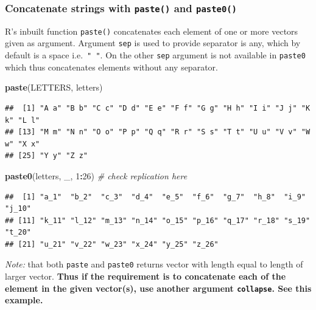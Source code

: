 \documentclass[
]{book}
\newenvironment{Shaded}{\begin{snugshade}}{\end{snugshade}}
\newcommand{\CommentTok}[1]{\textcolor[rgb]{0.56,0.35,0.01}{\textit{#1}}}
\newcommand{\DecValTok}[1]{\textcolor[rgb]{0.00,0.00,0.81}{#1}}
\newcommand{\FunctionTok}[1]{\textcolor[rgb]{0.13,0.29,0.53}{\textbf{#1}}}
\newcommand{\NormalTok}[1]{#1}
\newcommand{\SpecialCharTok}[1]{\textcolor[rgb]{0.81,0.36,0.00}{\textbf{#1}}}
\newcommand{\StringTok}[1]{\textcolor[rgb]{0.31,0.60,0.02}{#1}}
\begin{document}
\hypertarget{concatenate-strings-with-paste-and-paste0}{%
\subsubsection*{\texorpdfstring{Concatenate strings with \texttt{paste()} and \texttt{paste0()}}{Concatenate strings with paste() and paste0()}}\label{concatenate-strings-with-paste-and-paste0}}

R's inbuilt function \texttt{paste()} concatenates each element of one or more vectors given as argument. Argument \texttt{sep} is used to provide separator is any, which by default is a space i.e.~\texttt{"\ "}. On the other \texttt{sep} argument is not available in \texttt{paste0} which thus concatenates elements without any separator.

\begin{Shaded}
\begin{Highlighting}[]
\FunctionTok{paste}\NormalTok{(LETTERS, letters)}
\end{Highlighting}
\end{Shaded}

\begin{verbatim}
##  [1] "A a" "B b" "C c" "D d" "E e" "F f" "G g" "H h" "I i" "J j" "K k" "L l"
## [13] "M m" "N n" "O o" "P p" "Q q" "R r" "S s" "T t" "U u" "V v" "W w" "X x"
## [25] "Y y" "Z z"
\end{verbatim}

\begin{Shaded}
\begin{Highlighting}[]
\FunctionTok{paste0}\NormalTok{(letters, }\StringTok{\textquotesingle{}\_\textquotesingle{}}\NormalTok{, }\DecValTok{1}\SpecialCharTok{:}\DecValTok{26}\NormalTok{) }\CommentTok{\# check replication here}
\end{Highlighting}
\end{Shaded}

\begin{verbatim}
##  [1] "a_1"  "b_2"  "c_3"  "d_4"  "e_5"  "f_6"  "g_7"  "h_8"  "i_9"  "j_10"
## [11] "k_11" "l_12" "m_13" "n_14" "o_15" "p_16" "q_17" "r_18" "s_19" "t_20"
## [21] "u_21" "v_22" "w_23" "x_24" "y_25" "z_26"
\end{verbatim}

\emph{Note:} that both \texttt{paste} and \texttt{paste0} returns vector with length equal to length of larger vector. \textbf{Thus if the requirement is to concatenate each of the element in the given vector(s), use another argument \texttt{collapse}. See this example.}
\end{document}

